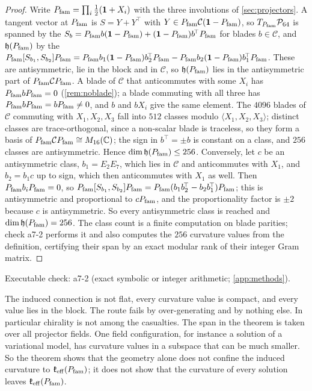\begin{proof}
Write $P_{\rm fam}=\prod_i\tfrac12(\mathbf 1+X_i)$ with the three involutions of \cref{sec:projectors}. A tangent vector at $P_{\rm fam}$ is $S=Y+Y^{\!\top}$ with
$Y\in P_{\rm fam}\mathcal C(\mathbf 1-P_{\rm fam})$, so $T_{P_{\rm fam}}\mathcal P_{64}$ is spanned by the $S_b=P_{\rm fam} b(\mathbf 1-P_{\rm fam})+(\mathbf 1-P_{\rm fam})b^{\!\top}P_{\rm fam}$ for blades $b\in\mathcal C$, and
$\mathfrak h(P_{\rm fam})$ by the $P_{\rm fam}[S_{b_1},S_{b_2}]P_{\rm fam}=P_{\rm fam} b_1(\mathbf 1-P_{\rm fam})b_2^{\!\top}P_{\rm fam}-P_{\rm fam} b_2(\mathbf 1-P_{\rm fam})b_1^{\!\top}P_{\rm fam}$. These are antisymmetric, lie in
the block and in $\mathcal C$, so $\mathfrak h(P_{\rm fam})$ lies in the antisymmetric part of $P_{\rm fam}\mathcal CP_{\rm fam}$. A blade of $\mathcal C$ that anticommutes
with some $X_i$ has $P_{\rm fam} bP_{\rm fam}=0$ (\cref{rem:noblade}); a blade commuting with all three has $P_{\rm fam} bP_{\rm fam}=bP_{\rm fam}\neq0$, and $b$ and $bX_i$ give the same
element. The $4096$ blades of $\mathcal C$ commuting with $X_1,X_2,X_3$ fall into $512$ classes modulo $\langle X_1,X_2,X_3\rangle$; distinct classes are
trace-orthogonal, since a non-scalar blade is traceless, so they form a basis of $P_{\rm fam}\mathcal CP_{\rm fam}\cong M_{16}(\mathbb{C})$; the sign in $b^{\!\top}=\pm b$ is
constant on a class, and $256$ classes are antisymmetric. Hence $\dim\mathfrak h(P_{\rm fam})\le256$. Conversely, let $c$ be an antisymmetric class, $b_1=E_2E_7$,
which lies in $\mathcal C$ and anticommutes with $X_1$, and $b_2=b_1c$ up to sign, which then anticommutes with $X_1$ as well. Then $P_{\rm fam} b_iP_{\rm fam}=0$, so
$P_{\rm fam}[S_{b_1},S_{b_2}]P_{\rm fam}=P_{\rm fam}(b_1b_2^{\!\top}-b_2b_1^{\!\top})P_{\rm fam}$; this is antisymmetric and proportional to $cP_{\rm fam}$, and the proportionality factor is
$\pm2$ because $c$ is antisymmetric. So every antisymmetric class is reached and $\dim\mathfrak h(P_{\rm fam})=256$. The class count is a finite
computation on blade parities; check a7-2 performs it and also computes the $256$ curvature values from the definition, certifying their span by an exact
modular rank of their integer Gram matrix.
\end{proof}

\noindent Executable check: a7-2 (exact symbolic or integer arithmetic; \cref{app:methods}).

The induced connection is not flat, every curvature value is compact, and every value lies in the block. The route fails by
over-generating and by nothing else. In particular chirality is not among the casualties. The span in the theorem is taken over all projector
fields. One field configuration, for instance a solution of a variational model, has curvature values in a subspace that can be much
smaller. So the theorem shows that the geometry alone does not confine the induced curvature to $\mathfrak k_{\rm eff}(P_{\rm fam})$; it does not show that the
curvature of every solution leaves $\mathfrak k_{\rm eff}(P_{\rm fam})$.

